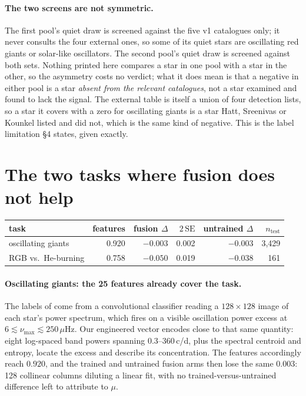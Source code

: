 \documentclass{article}
\begin{document}
\paragraph{The two screens are not symmetric.} The first pool's quiet draw is screened against the
five v1 catalogues only; it never consults the four external ones, so some of its quiet stars are
oscillating red giants or solar-like oscillators. The second pool's quiet draw is screened against
both sets. Nothing printed here compares a star in one pool with a star in the other, so the
asymmetry costs no verdict; what it does mean is that a negative in either pool is a star
\emph{absent from the relevant catalogues}, not a star examined and found to lack the signal. The
external table is itself a union of four detection lists, so a star it covers with a zero for
oscillating giants is a star Hatt, Sreenivas or Kounkel listed and \citet{hon2021} did not, which is
the same kind of negative. This is the label limitation \S4 states, given exactly.

\section{The two tasks where fusion does not help}
\label{app:negatives}

\begin{center}
\small
\begin{tabular}{lrrrrr}
\toprule
task & features & fusion $\Delta$ & $2\,\mathrm{SE}$ & untrained $\Delta$ & $n_{\mathrm{test}}$ \\
\midrule
oscillating giants & 0.920 & $-0.003$ & 0.002 & $-0.003$ & 3{,}429 \\
RGB vs.\ He-burning & 0.758 & $-0.050$ & 0.019 & $-0.038$ & 161 \\
\bottomrule
\end{tabular}
\end{center}

\paragraph{Oscillating giants: the 25 features already cover the task.} The labels of
\citet{hon2021} come from a convolutional classifier reading a $128 \times 128$ image of each star's
power spectrum, which fires on a visible oscillation power excess at
$6 \lesssim \nu_{\max} \lesssim 250\,\mu$Hz. Our engineered vector encodes close to that same
quantity: eight log-spaced band powers spanning 0.3--360\,c/d, plus the spectral centroid and
entropy, locate the excess and describe its concentration. The features accordingly reach $0.920$,
and the trained and untrained fusion arms then lose the same $0.003$: 128 collinear columns
diluting a linear fit, with no trained-versus-untrained difference left to attribute to $\mu$.
\end{document}
